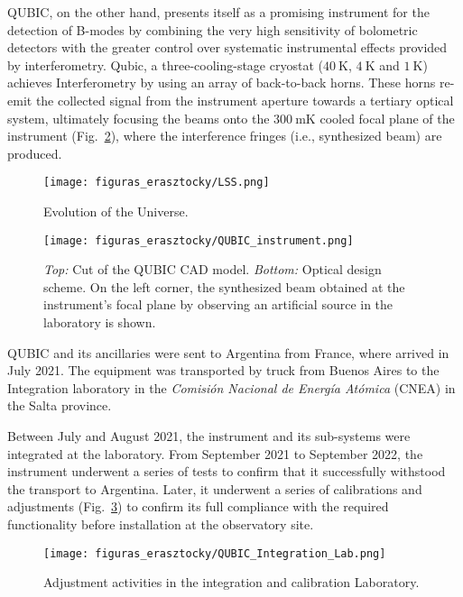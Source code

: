 \documentclass[baaa]{baaa}
\begin{document}
QUBIC, on the other hand, presents itself as a promising instrument for the detection of B-modes by combining the very high sensitivity of bolometric detectors with the greater control over systematic instrumental effects provided by interferometry. Qubic, a three-cooling-stage cryostat ($40~\mathrm{K}$, $4~\mathrm{K}$ and $1~\mathrm{K}$) achieves  Interferometry by using an array of back-to-back horns. These horns re-emit the collected signal from the instrument aperture towards a tertiary optical system, ultimately focusing the beams onto the $300~\mathrm{mK}$ cooled focal plane of the instrument (Fig.~\ref{QUBIC_instrument}), where the interference fringes (i.e., synthesized beam) are produced.


\begin{figure}[!t]
\centering
\texttt{[image: figuras\_erasztocky/LSS.png]}
\caption{Evolution of the Universe.}
\label{LSS}
\end{figure}

\begin{figure}[!t]
\centering
\texttt{[image: figuras\_erasztocky/QUBIC\_instrument.png]}
\caption{\emph{Top:} Cut of the QUBIC CAD model. \emph{Bottom:} Optical design scheme. On the left corner, the synthesized beam obtained at the instrument's focal plane by observing an artificial source in the laboratory is shown.}
\label{QUBIC_instrument}
\end{figure}

QUBIC and its ancillaries were sent to Argentina from France, where arrived in July 2021. The equipment was transported by truck from Buenos Aires to the Integration laboratory in the \textit{Comisión Nacional de Energía Atómica} (CNEA) in the Salta province.

Between July and August 2021, the instrument and its sub-systems were integrated at the laboratory. From September 2021 to September 2022, the instrument underwent a series of tests to confirm that it successfully withstood the transport to Argentina. Later, it underwent a series of calibrations and adjustments (Fig.~\ref{QUBIC_Integration_Lab}) to confirm its full compliance with the required functionality before installation at the observatory site.

\begin{figure}[!t]
\centering
\texttt{[image: figuras\_erasztocky/QUBIC\_Integration\_Lab.png]}
\caption{Adjustment activities in the integration and calibration Laboratory.}
\label{QUBIC_Integration_Lab}
\end{figure}
\end{document}
